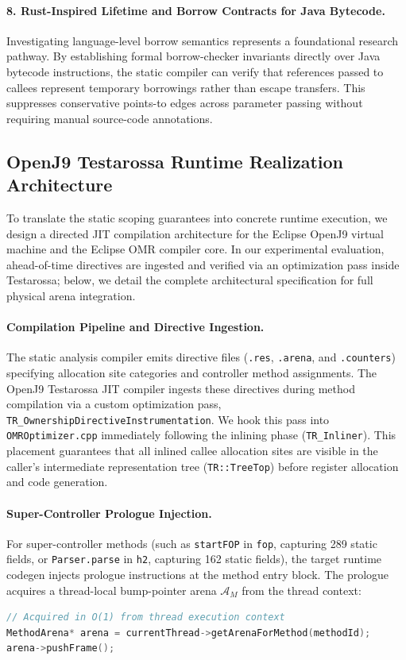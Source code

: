 \documentclass[12pt,a4paper]{article}
\begin{document}
\paragraph{8. Rust-Inspired Lifetime and Borrow Contracts for Java Bytecode.}
Investigating language-level borrow semantics represents a foundational research pathway. By establishing formal borrow-checker invariants directly over Java bytecode instructions, the static compiler can verify that references passed to callees represent temporary borrowings rather than escape transfers. This suppresses conservative points-to edges across parameter passing without requiring manual source-code annotations.

\subsection{OpenJ9 Testarossa Runtime Realization Architecture}
\label{sec:openj9-implementation}

To translate the static scoping guarantees into concrete runtime execution, we design a directed JIT compilation architecture for the Eclipse OpenJ9 virtual machine and the Eclipse OMR compiler core. In our experimental evaluation, ahead-of-time directives are ingested and verified via an optimization pass inside Testarossa; below, we detail the complete architectural specification for full physical arena integration.

\paragraph{Compilation Pipeline and Directive Ingestion.}
The static analysis compiler emits directive files (\texttt{.res}, \texttt{.arena}, and \texttt{.counters}) specifying allocation site categories and controller method assignments. The OpenJ9 Testarossa JIT compiler ingests these directives during method compilation via a custom optimization pass, \texttt{TR\_OwnershipDirectiveInstrumentation}. We hook this pass into \texttt{OMROptimizer.cpp} immediately following the inlining phase (\texttt{TR\_Inliner}). This placement guarantees that all inlined callee allocation sites are visible in the caller's intermediate representation tree (\texttt{TR::TreeTop}) before register allocation and code generation.

\paragraph{Super-Controller Prologue Injection.}
For super-controller methods (such as \texttt{startFOP} in \texttt{fop}, capturing 289 static fields, or \texttt{Parser.parse} in \texttt{h2}, capturing 162 static fields), the target runtime codegen injects prologue instructions at the method entry block. The prologue acquires a thread-local bump-pointer arena $\mathcal{A}_M$ from the thread context:
\begin{lstlisting}[language=C++]
// Acquired in O(1) from thread execution context
MethodArena* arena = currentThread->getArenaForMethod(methodId);
arena->pushFrame();
\end{lstlisting}
\end{document}
